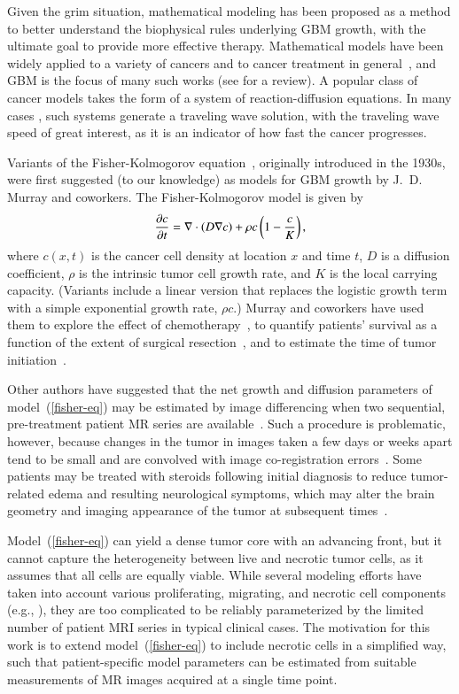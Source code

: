 \documentclass{aims}
\numberwithin{equation}{section}
\begin{document}
Given the grim situation, mathematical modeling has been proposed as a
method to better understand the biophysical rules underlying GBM growth,
with the ultimate goal to provide more effective therapy.  Mathematical
models have been widely applied to a variety of cancers and to cancer
treatment in general~\cite{Kuang}, and GBM is the focus of many such works
(see \cite{Martirosyan2015} for a review).  A popular class of cancer models
takes the form of a system of reaction-diffusion equations. In many cases
\cite{Harley2014,Gerlee2016,Stepien2018}, such systems generate a traveling
wave solution, with the traveling wave speed of great interest, as it is an
indicator of how fast the cancer progresses.

Variants of the Fisher-Kolmogorov equation~\cite{FISHER1937}, originally introduced
in the 1930s, were first suggested (to our knowledge)
as models for GBM growth by J.~D. Murray and coworkers.
The Fisher-Kolmogorov model is given by
\begin{equation}
\frac{\partial c}{\partial t} = \nabla\cdot\left(D \nabla{c}\right) + \rho c \left(1 - \frac{c}{K}\right),
\label{fisher-eq}
\end{equation}
where $c(x,t)$ is the cancer cell density at location $x$ and time $t$, $D$
is a diffusion coefficient, $\rho$ is the intrinsic tumor cell growth rate,
and $K$ is the local carrying capacity.  (Variants include a linear version
that replaces the logistic growth term with a simple exponential growth
rate, $\rho c$.)  Murray and coworkers have used them to explore the effect of
chemotherapy~\cite{Tracqui1995}, to quantify patients' survival as a function
of the extent of surgical resection~\cite{Woodward1996},
and to estimate the time of tumor initiation~\cite{Murray2012}.

Other authors have suggested that the net growth and diffusion parameters
of model~(\ref{fisher-eq}) may be estimated by image differencing when
two sequential, pre-treatment patient MR series are
available~\cite{Swanson2008,Neal2013,Jackson2015a}.
Such a procedure is problematic, however, because changes in
the tumor in images taken a few days or weeks apart tend to be small
and are convolved with image co-registration errors~\cite{vanderHorn2016}.
Some patients may be treated with
steroids following initial diagnosis to reduce tumor-related edema and
resulting neurological symptoms,
which may alter the brain geometry and imaging appearance of the
tumor at subsequent times~\cite{Watling1994,Zaki2004}.

Model~(\ref{fisher-eq}) can yield a dense tumor
core with an advancing front, but it cannot capture the heterogeneity between
live and necrotic tumor cells, as it assumes that all cells are equally
viable.  While several modeling efforts have taken into account various
proliferating, migrating, and necrotic cell components (e.g.,
\cite{Eikenberry2009,Swanson2011}), they are too complicated to be reliably
parameterized by the limited number of patient MRI series in typical
clinical cases.  The motivation for this work is to extend model~(\ref{fisher-eq})
to include necrotic cells in a simplified way, such that
patient-specific model parameters can be estimated from suitable measurements of MR
images acquired at a single time point.
\end{document}
